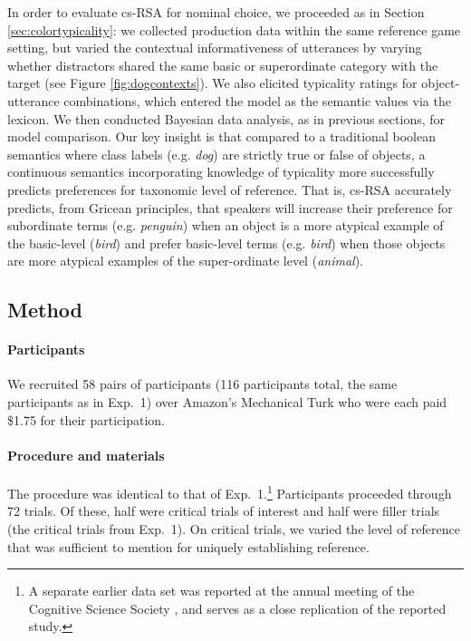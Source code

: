 \documentclass[11pt]{article}
\newcommand{\figref}[1]{Figure \ref{#1}}
\newcommand{\sectionref}[1]{Section \ref{#1}}
\begin{document}
In order to evaluate cs-RSA for nominal choice, we proceeded as in \sectionref{sec:colortypicality}: we collected production data within the same reference game setting, but varied the contextual informativeness of utterances by varying whether distractors shared the same basic or superordinate category with the target (see \figref{fig:dogcontexts}). We also elicited typicality ratings for object-utterance combinations, which entered the model as the semantic values via the lexicon. We then conducted Bayesian data analysis, as in previous sections, for model comparison.
Our key insight is that compared to a traditional boolean semantics where class labels (e.g. \emph{dog}) are strictly true or false of objects, a continuous semantics incorporating knowledge of typicality more successfully predicts preferences for taxonomic level of reference.
That is, cs-RSA accurately predicts, from Gricean principles, that speakers will increase their preference for subordinate terms (e.g. \emph{penguin}) when an object is a more atypical example of the basic-level (\emph{bird}) and prefer basic-level terms (e.g. \emph{bird}) when those objects are more atypical examples of the super-ordinate level (\emph{animal}). 


\subsection{Method}

\paragraph{Participants}

We recruited 58 pairs of participants (116 participants total, the same participants as in Exp.~1) over Amazon's Mechanical Turk who were each paid \$1.75 for their participation. 

\paragraph{Procedure and materials}

The procedure was identical to that of Exp.~1.\footnote{A separate earlier data set was reported at the annual meeting of the Cognitive Science Society \cite{GrafEtAl2016}, and serves as a close replication of the reported study.} Participants proceeded through 72 trials. Of these, half were critical trials of interest and half were filler trials (the critical trials from Exp.~1). On critical trials, we varied the level of reference that was sufficient to mention for uniquely establishing reference.
\end{document}
